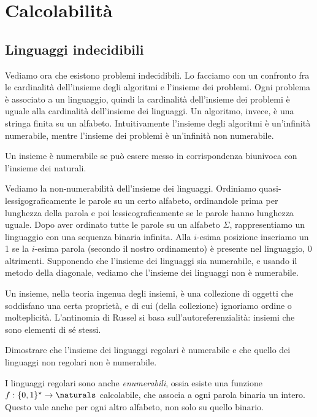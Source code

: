 
\chapter{Calcolabilit\`a}

\section{Linguaggi indecidibili}

Vediamo ora che esistono problemi indecidibili.
Lo facciamo con un confronto fra le cardinalit\`a dell'insieme degli algoritmi e l'insieme dei problemi.
Ogni problema \`e associato a un linguaggio, quindi la cardinalit\`a dell'insieme dei problemi \`e uguale alla cardinalit\`a dell'insieme dei linguaggi. 
Un algoritmo, invece, \`e una stringa finita su un alfabeto.
Intuitivamente l'insieme degli algoritmi \`e un'infinit\`a numerabile, mentre l'insieme dei problemi \`e un'infinit\`a non numerabile.

Un insieme \`e numerabile se pu\`o essere messo in corrispondenza biunivoca con l'insieme dei naturali.

Vediamo la non-numerabilit\`a dell'insieme dei linguaggi.
Ordiniamo quasi-lessigograficamente le parole su un certo alfabeto, ordinandole prima per lunghezza della parola e poi lessicograficamente se le parole hanno lunghezza uguale.
Dopo aver ordinato tutte le parole su un alfabeto $\Sigma$, rappresentiamo un linguaggio con una sequenza binaria infinita.
Alla $i$-esima posizione inseriamo un 1 se la $i$-esima parola (secondo il nostro ordinamento) \`e presente nel linguaggio, 0 altrimenti.
Supponendo che l'insieme dei linguaggi sia numerabile, e usando il metodo della diagonale, vediamo che l'insieme dei linguaggi non \`e numerabile.

Un insieme, nella teoria ingenua degli insiemi, \`e una collezione di oggetti che soddisfano una certa propriet\`a, e di cui (della collezione) ignoriamo ordine o molteplicit\`a.
L'antinomia di Russel si basa sull'autoreferenzialit\`a: insiemi che sono elementi di s\'e stessi.

\begin{esercizio}
	Dimostrare che l'insieme dei linguaggi regolari \`e numerabile e che quello dei linguaggi non regolari non \`e numerabile.
\end{esercizio}

I linguaggi regolari sono anche \emph{enumerabili}, ossia esiste una funzione $f: \{0,1\}^{\star} \to \naturals$ calcolabile, che associa a ogni parola binaria un intero.
Questo vale anche per ogni altro alfabeto, non solo su quello binario.

